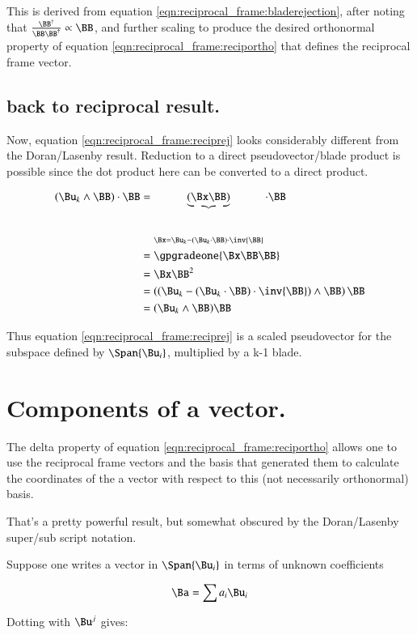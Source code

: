This is derived from equation \ref{eqn:reciprocal_frame:bladerejection}, after noting that
$\frac{\BB^\dagger}{\BB\BB^\dagger} \propto \BB$, and further
scaling to produce the desired orthonormal property of equation
\ref{eqn:reciprocal_frame:reciportho}
that defines the reciprocal frame vector.

\subsection{back to reciprocal result. }

Now, 
equation \ref{eqn:reciprocal_frame:reciprej}
looks considerably different from the Doran/Lasenby result.
Reduction to a direct pseudovector/blade product is possible since the
dot product here can be converted to a direct product.

\begin{align*}
(\Bu_k \wedge \BB) \cdot \BB
&= 
\underbrace{(\Bx \BB)}_{\Bx = \Bu_k - (\Bu_k \cdot \BB) \cdot \inv{\BB}}
\cdot \BB \\
&= \gpgradeone{
\Bx\BB \BB
} \\
&= \Bx \BB^2 \\
&= \left(\left(\Bu_k - (\Bu_k \cdot \BB) \cdot \inv{\BB}\right) \wedge \BB\right) \BB \\
&= (\Bu_k \wedge \BB) \BB \\
\end{align*}

Thus equation \ref{eqn:reciprocal_frame:reciprej} is a scaled pseudovector for the subspace
defined by $\Span {\Bu_i}$, multiplied by a k-1 blade.

\section{Components of a vector. }

The delta property of 
equation \ref{eqn:reciprocal_frame:reciportho} allows one to use the reciprocal frame
vectors and the basis that generated them to calculate the coordinates
of the a vector with respect to this (not necessarily orthonormal) basis.

That's a pretty powerful result, but somewhat obscured by the Doran/Lasenby
super/sub script notation.

Suppose one writes a vector in $\Span{\Bu_i}$ in terms of unknown coefficients 

\[
\Ba = \sum a_i \Bu_i
\]

Dotting with $\Bu^j$ gives:

